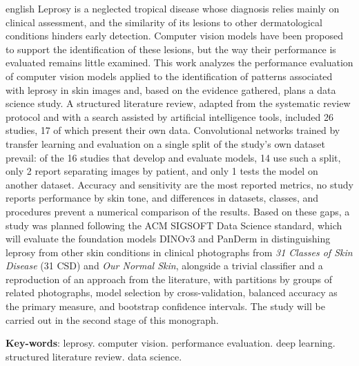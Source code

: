 \begin{resumo}[Abstract]
	\begin{otherlanguage*}{english}
		Leprosy is a neglected tropical disease whose diagnosis relies mainly on
		clinical assessment, and the similarity of its lesions to other
		dermatological conditions hinders early detection. Computer vision models
		have been proposed to support the identification of these lesions, but the
		way their performance is evaluated remains little examined. This work
		analyzes the performance evaluation of computer vision models applied to the
		identification of patterns associated with leprosy in skin images and, based
		on the evidence gathered, plans a data science study. A structured
		literature review, adapted from the systematic review protocol and with a
		search assisted by artificial intelligence tools, included 26 studies, 17 of
		which present their own data. Convolutional networks trained by transfer
		learning and evaluation on a single split of the study's own dataset
		prevail: of the 16 studies that develop and evaluate models, 14 use such a
		split, only 2 report separating images by patient, and only 1 tests the
		model on another dataset. Accuracy and sensitivity are the most reported
		metrics, no study reports performance by skin tone, and differences in
		datasets, classes, and procedures prevent a numerical comparison of the
		results. Based on these gaps, a study was planned following the ACM SIGSOFT
		Data Science standard, which will evaluate the foundation models DINOv3 and
		PanDerm in distinguishing leprosy from other skin conditions in
		clinical photographs from \textit{31 Classes of Skin Disease} (31 CSD) and \textit{Our Normal Skin}, alongside a
		trivial classifier and a reproduction of an approach from the literature,
		with partitions by groups of related photographs, model selection by
		cross-validation, balanced accuracy as the primary measure, and bootstrap
		confidence intervals. The study will be
		carried out in the second stage of this monograph.

		\vspace{\onelineskip}

		\noindent
		\textbf{Key-words}: leprosy. computer vision. performance evaluation. deep
		learning. structured literature review. data science.
	\end{otherlanguage*}
\end{resumo}
